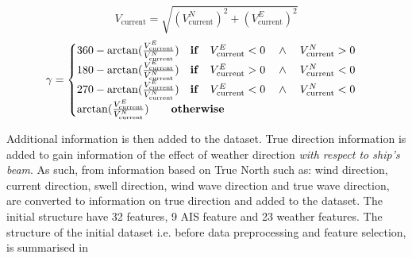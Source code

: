 \begin{equation}\label{eqn:vcurrabs}
    V_{\text{current}} = \sqrt{(V_{\text{current}}^N)^2 + (V_{\text{current}}^E)^2} 
\end{equation}
\begin{equation}\label{eqn:currdir}
    \gamma = 
    \begin{cases}
        360 - \arctan(\frac{V_{\text{current}}^E}{V_{\text{current}}^N}) \quad \text{\textbf{if}} \quad V_{\text{current}}^E < 0 \quad \wedge \quad V_{\text{current}}^N > 0 \\ 
        180 - \arctan(\frac{V_{\text{current}}^E}{V_{\text{current}}^N}) \quad \text{\textbf{if}} \quad V_{\text{current}}^E > 0 \quad \wedge \quad V_{\text{current}}^N < 0 \\ 
        270 - \arctan(\frac{V_{\text{current}}^E}{V_{\text{current}}^N}) \quad \text{\textbf{if}} \quad V_{\text{current}}^E < 0 \quad \wedge \quad V_{\text{current}}^N < 0 \\
        \arctan(\frac{V_{\text{current}}^E}{V_{\text{current}}^N}) \qquad \text{\textbf{otherwise}} 
    \end{cases}   
\end{equation}

Additional information is then added to the dataset. True direction information is added to gain information of the effect of weather direction \emph{with respect to ship's beam}. As such, from information based on True North such as: wind direction, current direction, swell direction, wind wave direction and true wave direction, are converted to information on true direction and added to the dataset. The initial structure have 32 features, 9 AIS feature and 23 weather features. The structure of the initial dataset i.e. before data preprocessing and feature selection, is summarised in  \\

